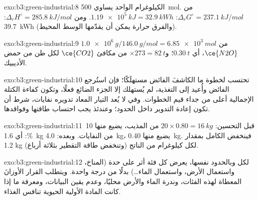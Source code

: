 \begin{solution}{exo:b3:green-industrial:8}
الكيلوغرام الواحد يساوي \qty{500}{mol}. من $\Delta_rG^\circ = \qty{237.1}{kJ/mol}$: $\qty{1.19e5}{kJ} = \qty{32.9}{kWh}$. ومن $\Delta_rH^\circ = \qty{285.8}{kJ/mol}$: \qty{39.7}{kWh}
(والفرق حرارة يمكن أن يقدّمها الوسط المحيط).
\end{solution}

\begin{solution}{exo:b3:green-industrial:9}
$\qty{1.0e6}{g}/\qty{146.0}{g/mol} = \qty{6.85e3}{mol}$ من $\ce{N2O}$، أي $\qty{0.30}{t}$؛ و$\times 273 = \qty{82}{t}$ من مكافئ $\ce{CO2}$ لكل طن من حمض الأديبيك.
\end{solution}

\begin{solution}{exo:b3:green-industrial:10}
تحتسب  لخطوة ما الكاشفَ الفائض مستهلَكًا؛ فإن استُرجع الفائض
وأُعيد إلى التغذية، لم يُستهلك إلا الجزء الضائع فعلًا، وتكون كفاءة الكتلة
الإجمالية أعلى من جداء قيم الخطوات. وفي  لا يُعد
التيار المعاد تدويره نفايات، شرط أن تكون إعادة التدوير داخل الحدود؛
وعندئذ يجب احتساب طاقتها وفواقدها.
\end{solution}

\begin{solution}{exo:b3:green-industrial:11}
قبل التحسين: $20 \times 0.80 = \qty{16}{kg}$ من المذيب، يضيع منها 10\,\%: أي \qty{1.6}{kg} من النفايات. وبعده: \qty{4.0}{kg}، يضيع منها \qty{0.40}{kg}. فينخفض
 الكامل بمقدار 1.2 kg لكل كيلوغرام من الناتج (وتنخفض طاقة التقطير
بثلاثة أرباع).
\end{solution}

\begin{solution}{exo:b3:green-industrial:12}
لكل  وبالحدود نفسها، يعرض كل فئة أثر
على حدة (المناخ، واستعمال الأرض، واستعمال الماء\dots) بدلًا من درجة واحدة. ويتطلب
القرار الأوزانَ المعطاة لهذه الفئات، وندرة الماء
والأرض محليًا، وعدم يقين البيانات، ومعرفة ما إذا كانت المادة الأولية الحيوية
تنافس الغذاء.
\end{solution}

